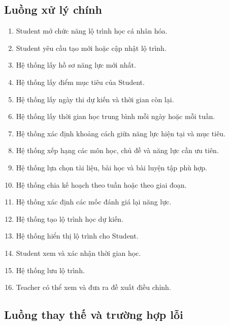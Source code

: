 \subsection{Luồng xử lý chính}

\begin{enumerate}
	\item Student mở chức năng lộ trình học cá nhân hóa.
	
	\item Student yêu cầu tạo mới hoặc cập nhật lộ trình.
	
	\item Hệ thống lấy hồ sơ năng lực mới nhất.
	
	\item Hệ thống lấy điểm mục tiêu của Student.
	
	\item Hệ thống lấy ngày thi dự kiến và thời gian còn lại.
	
	\item Hệ thống lấy thời gian học trung bình mỗi ngày hoặc mỗi tuần.
	
	\item Hệ thống xác định khoảng cách giữa năng lực hiện tại và mục tiêu.
	
	\item Hệ thống xếp hạng các môn học, chủ đề và năng lực cần ưu tiên.
	
	\item Hệ thống lựa chọn tài liệu, bài học và bài luyện tập phù hợp.
	
	\item Hệ thống chia kế hoạch theo tuần hoặc theo giai đoạn.
	
	\item Hệ thống xác định các mốc đánh giá lại năng lực.
	
	\item Hệ thống tạo lộ trình học dự kiến.
	
	\item Hệ thống hiển thị lộ trình cho Student.
	
	\item Student xem và xác nhận thời gian học.
	
	\item Hệ thống lưu lộ trình.
	
	\item Teacher có thể xem và đưa ra đề xuất điều chỉnh.
\end{enumerate}

\subsection{Luồng thay thế và trường hợp lỗi}

